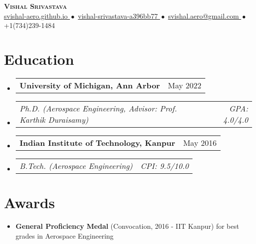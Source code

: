\documentclass[letterpaper, 11pt]{article}
\makeatletter
\newcommand{\resumeItem}[1]{
  \item\small{{#1\vspace{-2pt}}}
}
\newcommand{\resumeStint}[2]{
  \vspace{-2pt}\item
    \begin{tabular*}{0.97\textwidth}[t]{@{}l@{\extracolsep{\fill}}r}
    \textbf{\small #1} & {\small #2}
  \end{tabular*}\vspace{-7pt}
}
\newcommand{\resumeSubstint}[2]{
  \vspace{-16pt}\item
    \begin{tabular*}{0.97\textwidth}[t]{@{}l@{\extracolsep{\fill}}r}
    {\textit{\small#1}}&{\textit{\small#2}}
  \end{tabular*}%
}
\newcommand{\resumeSubHeadingListStart}{\begin{itemize}[leftmargin=0.15in, label={}]}
\newcommand{\resumeSubHeadingListEnd}{\end{itemize}}
\makeatother
\begin{document}

  \vspace*{0.25in}


  \begin{center}
    \textbf{\Huge\scshape Vishal Srivastava}\\
    \vspace{8pt}\small
    \href{https://svishal-aero.github.io}{
      svishal-aero.github.io
    }${ }{ }\bullet{ }{ }$
    \href{https://linkedin.com/in/vishal-srivastava-a396bb77/}{
      vishal-srivastava-a396bb77
    }${ }{ }\bullet{ }{ }$
    \href{mailto:svishal.aero@gmail.com}{
      svishal.aero@gmail.com
    }${ }{ }\bullet{ }{ }$
    +1$ $(734)$ $239-1484
  \end{center}


  \section{Education}
  \resumeSubHeadingListStart
    \resumeStint
    {University of Michigan, Ann Arbor}{May 2022}
    \resumeSubstint
    {Ph.D. (Aerospace Engineering, Advisor: Prof. Karthik Duraisamy)}{GPA: 4.0/4.0}
    \vspace{3pt}
    \resumeStint
    {Indian Institute of Technology, Kanpur}{May 2016}
    \resumeSubstint
    {B.Tech. (Aerospace Engineering)}{CPI: 9.5/10.0}
  \resumeSubHeadingListEnd


  \section{Awards}
  \resumeSubHeadingListStart
    \resumeItem{
      \textbf{General Proficiency Medal} (Convocation, 2016 - IIT Kanpur) for best grades in
      Aerospace Engineering
    }
  \resumeSubHeadingListEnd

\end{document}
